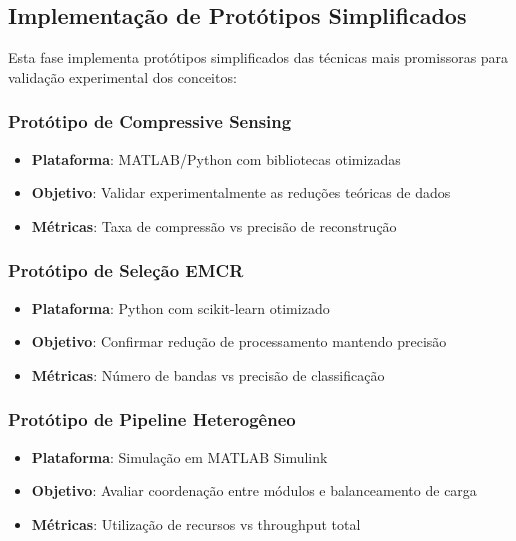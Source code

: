 \subsection{Implementação de Protótipos Simplificados}

Esta fase implementa protótipos simplificados das técnicas mais promissoras para validação experimental dos conceitos:

\subsubsection{Protótipo de Compressive Sensing}

\begin{itemize}
\item \textbf{Plataforma}: MATLAB/Python com bibliotecas otimizadas
\item \textbf{Objetivo}: Validar experimentalmente as reduções teóricas de dados
\item \textbf{Métricas}: Taxa de compressão vs precisão de reconstrução
\end{itemize}

\subsubsection{Protótipo de Seleção EMCR}

\begin{itemize}
\item \textbf{Plataforma}: Python com scikit-learn otimizado
\item \textbf{Objetivo}: Confirmar redução de processamento mantendo precisão
\item \textbf{Métricas}: Número de bandas vs precisão de classificação
\end{itemize}

\subsubsection{Protótipo de Pipeline Heterogêneo}

\begin{itemize}
\item \textbf{Plataforma}: Simulação em MATLAB Simulink
\item \textbf{Objetivo}: Avaliar coordenação entre módulos e balanceamento de carga
\item \textbf{Métricas}: Utilização de recursos vs throughput total
\end{itemize}

